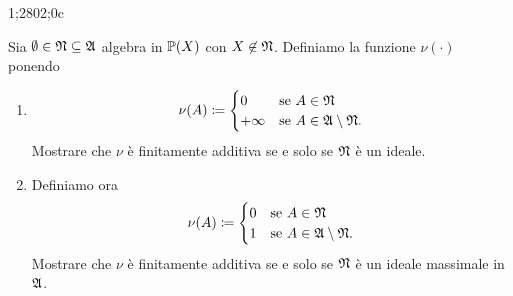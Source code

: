 1;2802;0c\documentclass[../EserciziIstituzioniAnalisi.tex]{subfiles}
\begin{document}
\begin{exercise}[13/10/2016]
  Sia $\emptyset \in \mathfrak N \subseteq \mathfrak A$ algebra in $\mathbb P(X)$ con $X \not\in \mathfrak N$. Definiamo la funzione $\nu(\cdot)$ ponendo
  \begin{enumerate}
    \item 
    \begin{equation*}
      \nu(A) \coloneqq
      \begin{cases}
        0 & \text{se $A \in \mathfrak N$}\\
        +\infty & \text{se $A \in \mathfrak A\setminus \mathfrak N$}.
      \end{cases}
    \end{equation*}
    Mostrare che $\nu$ è finitamente additiva se e solo se $\mathfrak N$ è un ideale. 
    \item Definiamo ora
    \begin{equation*}
      \nu(A) \coloneqq
      \begin{cases}
        0 & \text{se $A \in \mathfrak N$}\\
        1 & \text{se $A \in \mathfrak A\setminus \mathfrak N$}.
      \end{cases}
    \end{equation*}
    Mostrare che $\nu$ è finitamente additiva se e solo se $\mathfrak N$ è un ideale massimale in $\mathfrak A$.
  \end{enumerate}
\end{exercise}
\end{document}
